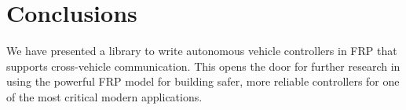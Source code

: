 \section{Conclusions}

We have presented a library to write autonomous vehicle controllers in FRP that supports cross-vehicle communication.
This opens the door for further research in using the powerful FRP model for building safer, more reliable controllers for one of the most critical modern applications.


